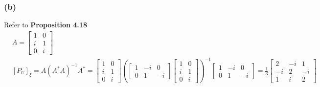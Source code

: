 \documentclass{article}
\begin{document}
\subsubsection*{(b)}
Refer to \textbf{Proposition 4.18}
\begin{equation*}
    \begin{split}
        &A = \begin{bmatrix}
            1 & 0 \\
            i & 1 \\
            0 & i 
        \end{bmatrix}\\
        &[P_U]_\xi = A(A^*A)^{-1}A^* = \begin{bmatrix}
            1 & 0 \\
            i & 1 \\
            0 & i 
        \end{bmatrix} (\begin{bmatrix}
            1 & -i & 0  \\
            0 & 1 & -i 
        \end{bmatrix} \begin{bmatrix}
            1 & 0 \\
            i & 1 \\
            0 & i 
        \end{bmatrix})^{-1} \begin{bmatrix}
            1 & -i & 0  \\
            0 & 1 & -i 
        \end{bmatrix} = \frac{1}{3}\begin{bmatrix}
            2 & -i & 1  \\
            -i & 2 & -i  \\
            1 & i & 2 
        \end{bmatrix}
    \end{split}
\end{equation*}
\end{document}
